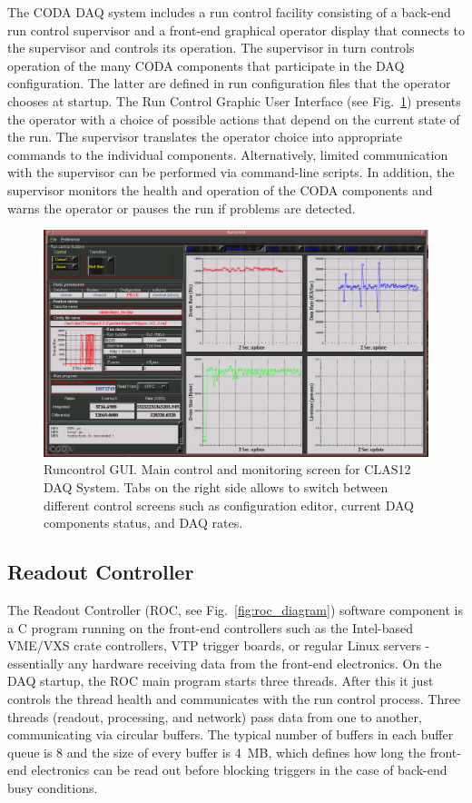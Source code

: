 The CODA DAQ system includes a run control facility consisting of a back-end run control supervisor and a front-end graphical operator display that connects to the supervisor and controls its operation. The supervisor in turn controls operation of the many CODA components that participate in the DAQ configuration. The latter are defined in run configuration files that the operator chooses at startup. The Run Control Graphic User Interface (see Fig.~\ref{fig:runcontrol1}) presents the operator with a choice of possible actions that depend on the current state of the run. The supervisor translates the operator choice into appropriate commands to the individual components. Alternatively, limited communication with the supervisor can be performed via command-line scripts. In addition, the supervisor monitors the health and operation of the CODA components and warns the operator or pauses the run if problems are detected.

\begin{figure}[hbt]
	\centering
	\includegraphics[width=1.0\columnwidth,keepaspectratio]{img/runcontrol1.png}
	\caption{Runcontrol GUI. Main control and monitoring screen for CLAS12 DAQ System. Tabs on the right side allows to switch between different control screens such as configuration editor, current DAQ components status, and DAQ rates.}
	\label{fig:runcontrol1}
\end{figure}





\subsection{Readout Controller}

The Readout Controller (ROC, see Fig.~\ref{fig:roc_diagram}) software component is a C program running on the front-end controllers such as the Intel-based VME/VXS crate controllers, VTP trigger boards, or regular Linux servers - essentially any hardware receiving data from the front-end electronics. On the DAQ startup, the ROC main program starts three threads. After this it just controls the thread health and communicates with the run control process. Three threads (readout, processing, and network) pass data from one to another, communicating via circular buffers. The typical number of buffers in each buffer queue is 8 and the size of every buffer is 4~MB, which defines how long the front-end electronics can be read out before blocking triggers in the case of back-end busy conditions.


